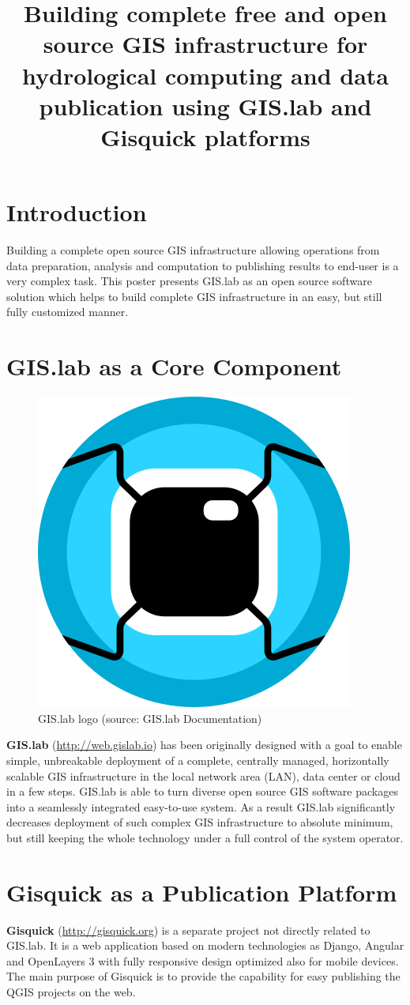 \documentclass{tudelftposter}
\title{Building complete free and open source GIS infrastructure for
  hydrological computing and data publication using GIS.lab and
  Gisquick platforms}
\begin{document}
\section{Introduction}

Building a complete open source GIS infrastructure allowing operations
from data preparation, analysis and computation to publishing results
to end-user is a very complex task. This poster presents GIS.lab as an
open source software solution which helps to build complete GIS
infrastructure in an easy, but still fully customized manner.

\section{GIS.lab as a Core Component}

\begin{figure}[ht!]
\begin{center}
  \includegraphics[width=.15\columnwidth]{../paper/figures/gislab-logo.png}
  \caption{GIS.lab logo (source: GIS.lab Documentation)}
\label{fig:gislab_logo}
\end{center}
\end{figure}

\noindent \textbf{GIS.lab} (\url{http://web.gislab.io}) has been
originally designed with a goal to enable simple, unbreakable
deployment of a complete, centrally managed, horizontally scalable GIS
infrastructure in the local network area (LAN), data center or cloud
in a few steps. GIS.lab is able to turn diverse open source GIS
software packages into a seamlessly integrated easy-to-use system. As
a result GIS.lab significantly decreases deployment of such complex
GIS infrastructure to absolute minimum, but still keeping the whole
technology under a full control of the system operator.

\section{Gisquick as a Publication Platform}

\textbf{Gisquick} (\url{http://gisquick.org}) is a separate project not
directly related to GIS.lab. It is a web application based on modern
technologies as Django, Angular and OpenLayers 3 with fully responsive
design optimized also for mobile devices. The main purpose of Gisquick
is to provide the capability for easy publishing the QGIS projects on
the web. 
\end{document}
